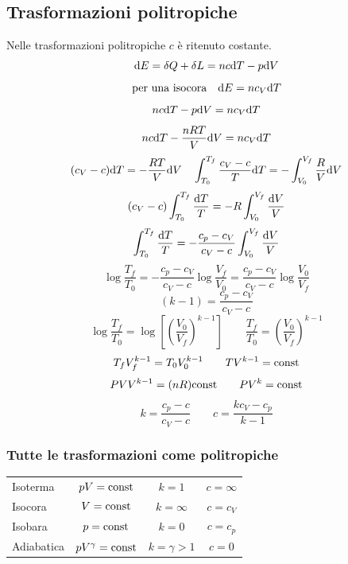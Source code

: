 \subsection{Trasformazioni politropiche}
Nelle trasformazioni politropiche $c$ è ritenuto costante.
\begin{equation*}\mathrm{d} E=\delta Q+\delta L=nc\mathrm{d} T-p\mathrm{d} V\end{equation*}
\begin{equation*}\text{per una isocora}\quad \mathrm{d} E=nc_V\mathrm{d} T\end{equation*}
\begin{equation*}nc\mathrm{d} T-p\mathrm{d} V=nc_V\mathrm{d} T\end{equation*}
\begin{equation*}nc\mathrm{d} T-\frac{nRT}{V}\mathrm{d} V=nc_V\mathrm{d} T\end{equation*}
\begin{equation*}(c_V-c)\mathrm{d} T=-\frac{RT}{V}\mathrm{d} V\quad \int_{T_0}^{T_f}\frac{c_V-c}{T}\mathrm{d} T=-\int_{V_0}^{V_f}\frac{R}{V}\mathrm{d} V\end{equation*}
\begin{equation*}(c_V-c)\int_{T_0}^{T_f}\frac{\mathrm{d} T}{T}=-R\int_{V_0}^{V_f}\frac{\mathrm{d} V}{V}\end{equation*}
\begin{equation*}\int_{T_0}^{T_f}\frac{\mathrm{d} T}{T}=-\frac{c_p-c_V}{c_V-c}\int_{V_0}^{V_f}\frac{\mathrm{d} V}{V}\end{equation*}
\begin{equation*}\log\frac{T_f}{T_0}=-\frac{c_p-c_V}{c_V-c}\log\frac{V_f}{V_0}=\frac{c_p-c_V}{c_V-c}\log\frac{V_0}{V_f}\end{equation*}
\begin{equation*}(k-1)=\frac{c_p-c_V}{c_V-c}\end{equation*}
\begin{equation*}\log\frac{T_f}{T_0}=\log\left[\left(\frac{V_0}{V_f}\right)^{k-1}\right]\qquad\frac{T_f}{T_0}=\left(\frac{V_0}{V_f}\right)^{k-1}\end{equation*}
\begin{equation*}T_fV_f^{k-1}=T_0V_0^{k-1}\qquad TV^{k-1}=\text{const}\end{equation*}
\begin{equation*}PVV^{k-1}=(nR)\text{const}\qquad PV^k=\text{const}\end{equation*}
\begin{equation*}k=\frac{c_p-c}{c_V-c}\qquad c=\frac{kc_V-c_p}{k-1}\end{equation*}
\subsubsection{Tutte le trasformazioni come politropiche}
\begin{center}
\begin{tabular}{l|ccc}
Isoterma&$pV=\text{const}$&$k=1$&$c=\infty$\\
Isocora&$V=\text{const}$&$k=\infty$&$c=c_V$\\
Isobara&$p=\text{const}$&$k=0$&$c=c_p$\\
Adiabatica&$pV^\gamma=\text{const}$&$k=\gamma>1$&$c=0$\\
\end{tabular}
\end{center}

